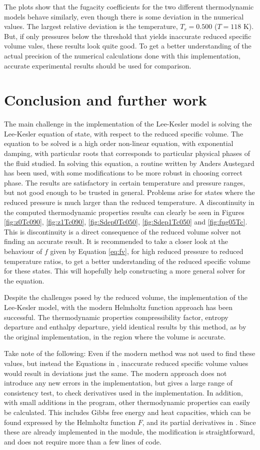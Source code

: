 \documentclass[internal,english]{sintefmemo2012}
\numberwithin{equation}{section}
\begin{document}
The plots show that the fugacity coefficients for the two different thermodynamic models behave similarly, even though there is some deviation in the numerical values. The largest relative deviation is the temperature, $T_r = 0.500$ ($T = 118$ K). But, if only pressures below the threshold that yields inaccurate reduced specific volume vales, these results look quite good. To get a better understanding of the actual precision of the numerical calculations done with this implementation, accurate experimental results should be used for comparison.

\section{Conclusion and further work}
The main challenge in the implementation of the Lee-Kesler model is solving the Lee-Kesler equation of state, with respect to the reduced specific volume. The equation to be solved is a high order non-linear equation, with exponential damping, with particular roots that corresponds to particular physical phases of the fluid studied. In solving this equation, a routine written by Anders Austegard has been used, with some modifications to be more robust in choosing correct phase. The results are satisfactory in certain temperature and pressure ranges, but not good enough to be trusted in general. Problems arise for states where the reduced pressure is much larger than the reduced temperature. A discontinuity in the computed thermodynamic properties results can clearly be seen in Figures \ref{fig:z0Tc090}, \ref{fig:z1Tc090}, \ref{fig:Sdep0Tc050}, \ref{fig:Sdep1Tc050} and \ref{fig:fug05Tc}. This is discontinuity is a direct consequence of the reduced volume solver not finding an accurate result. It is recommended to take a closer look at the behaviour of $f$ given by Equation \ref{eq:fv}, for high reduced pressure to reduced temperature ratios, to get a better understanding of the reduced specific volume for these states. This will hopefully help constructing a more general solver for the equation.

Despite the challenges posed by the reduced volume, the implementation of the Lee-Kesler model, with the modern Helmholtz function approach has been successful. The thermodynamic properties compressibility factor, entropy departure and enthalpy departure, yield identical results by this method, as by the original implementation, in the region where the volume is accurate. 

Take note of the following: Even if the modern method was not used to find these values, but instead the Equations in \cite{LK}, inaccurate reduced specific volume values would result in deviations just the same. The modern approach does not introduce any new errors in the implementation, but gives a large range of consistency test, to check derivatives used in the implementation. In addition, with small additions in the program, other thermodynamic properties can easily be calculated. This includes Gibbs free energy and heat capacities, which can be found expressed by the Helmholtz function $F$, and its partial derivatives in \cite{MM}. Since these are already implemented in the module, the modification is straightforward, and does not require more than a few lines of code.
\end{document}
